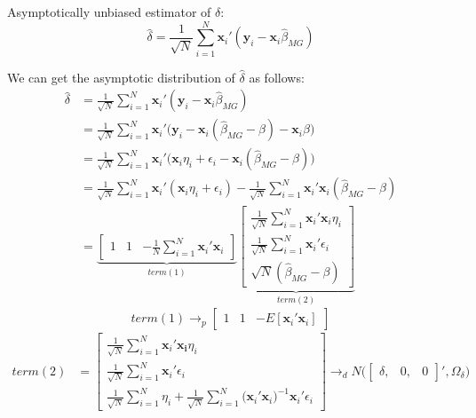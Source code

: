 Asymptotically unbiased estimator of $\delta$:
\[
\widehat{\delta} = \frac{1}{\sqrt{N}} \sum_{i=1}^N \mathbf{x}_i' (\mathbf{y}_i - \mathbf{x}_i \widehat{\beta}_{MG})
\]

\vspace{0.2in}

We can get the asymptotic distribution of $\widehat{\delta}$ as follows:
\begin{align*}
\widehat{\delta} &= \frac{1}{\sqrt{N}} \sum_{i=1}^N \mathbf{x}_i' (\mathbf{y}_i - \mathbf{x}_i \widehat{\beta}_{MG})\\
& = \frac{1}{\sqrt{N}} \sum_{i=1}^N \mathbf{x}_i' \big (\mathbf{y}_i - \mathbf{x}_i (\widehat{\beta}_{MG} - \beta) - \mathbf{x}_i \beta \big)\\
&= \frac{1}{\sqrt{N}} \sum_{i=1}^N \mathbf{x}_i'\big(\mathbf{x}_i\eta
_i + \epsilon_i -\mathbf{x}_i (\widehat{\beta}_{MG} - \beta) \big)\\
&= \frac{1}{\sqrt{N}} \sum_{i=1}^N \mathbf{x}_i'(\mathbf{x}_i\eta_i + \epsilon_i) - \frac{1}{\sqrt{N}} \sum_{i=1}^N \mathbf{x}_i'\mathbf{x}_i (\widehat{\beta}_{MG} - \beta)\\
&=\underbrace{\begin{bmatrix}
1 & 1& -\frac{1}{N}\sum_{i=1}^N \mathbf{x}_i'\mathbf{x}_i
\end{bmatrix}}_{term (1)} \underbrace{\begin{bmatrix}
\frac{1}{\sqrt{N}} \sum_{i=1}^N \mathbf{x}_i'\mathbf{x}_i \eta_i \\
\frac{1}{\sqrt{N}} \sum_{i=1}^N \mathbf{x}_i'\epsilon_i\\
\sqrt{N} (\widehat{\beta}_{MG} - \beta)
\end{bmatrix}}_{term (2)}
\end{align*}
\[
term(1) \rightarrow_{p} \begin{bmatrix}
1 & 1 & -E[\mathbf{x}_i'\mathbf{x}_i]
\end{bmatrix}
\]
\begin{align*}
term(2)& = \begin{bmatrix}
\frac{1}{\sqrt{N}} \sum_{i=1}^N \mathbf{x}_i' \mathbf{x_i} \eta_i\\
\frac{1}{\sqrt{N}} \sum_{i=1}^N \mathbf{x}_i' \epsilon_i \\
\frac{1}{\sqrt{N}} \sum_{i=1}^N \eta_i + \frac{1}{\sqrt{N}} \sum_{i=1}^N \big(\mathbf{x}_i'\mathbf{x}_i\big)^{-1}  \mathbf{x}_i'\epsilon_i 
\end{bmatrix} \rightarrow_d 
N\bigg( \begin{bmatrix}
\delta, & 0,& 0
\end{bmatrix}',  \Omega_\delta \bigg)
\end{align*}

